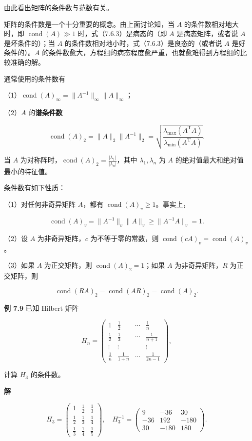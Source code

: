 \documentclass[
  10pt,
  fontset=fandol]{ctexart}
\begin{document}
由此看出矩阵的条件数与范数有关。

矩阵的条件数是一个十分重要的概念。由上面讨论知，当 \(A\) 的条件数相对地大时，即 \(\operatorname{cond}(A)\gg1\) 时，式（7.6.3）是病态的（即 \(A\) 是病态矩阵，或者说 \(A\) 是坏条件的）；当 \(A\) 的条件数相对地小时，式（7.6.3）是良态的（或者说 \(A\) 是好条件的）。\(A\) 的条件数愈大，方程组的病态程度愈严重，也就愈难得到方程组的比较准确的解。

通常使用的条件数有

（1）\(\operatorname{cond}(A)_\infty=\|A^{-1}\|_\infty\|A\|_\infty\)；

（2）\(A\) 的\textbf{谱条件数}

\[
\operatorname{cond}(A)_2=\|A\|_2\|A^{-1}\|_2
=\sqrt{\frac{\lambda_{\max}(A^{\mathrm T}A)}{\lambda_{\min}(A^{\mathrm T}A)}}.
\]

当 \(A\) 为对称阵时，\(\operatorname{cond}(A)_2=\frac{|\lambda_1|}{|\lambda_n|}\)，其中 \(\lambda_1,\lambda_n\) 为 \(A\) 的绝对值最大和绝对值最小的特征值。

条件数有如下性质：

（1）对任何非奇异矩阵 \(A\)，都有 \(\operatorname{cond}(A)_v\geqslant1\)。事实上，

\[
\operatorname{cond}(A)_v=\|A^{-1}\|_v\|A\|_v\geqslant\|A^{-1}A\|_v=1.
\]

（2）设 \(A\) 为非奇异矩阵，\(c\) 为不等于零的常数，则 \(\operatorname{cond}(cA)_v=\operatorname{cond}(A)_v\)。

（3）如果 \(A\) 为正交矩阵，则 \(\operatorname{cond}(A)_2=1\)；如果 \(A\) 为非奇异矩阵，\(R\) 为正交矩阵，则

\[
\operatorname{cond}(RA)_2=\operatorname{cond}(AR)_2=\operatorname{cond}(A)_2.
\]

\textbf{例 7.9} 已知 Hilbert 矩阵

\[
H_n=\begin{pmatrix}
1&\frac12&\cdots&\frac1n\\[4pt]
\frac12&\frac13&\cdots&\frac1{n+1}\\
\vdots&\vdots&&\vdots\\
\frac1n&\frac1{1+n}&\cdots&\frac1{2n-1}
\end{pmatrix},
\]

计算 \(H_3\) 的条件数。

\textbf{解}

\[
H_3=\begin{pmatrix}
1&\frac12&\frac13\\[4pt]
\frac12&\frac13&\frac14\\[4pt]
\frac13&\frac14&\frac15
\end{pmatrix},\quad
H_3^{-1}=\begin{pmatrix}
9&-36&30\\
-36&192&-180\\
30&-180&180
\end{pmatrix}.
\]
\end{document}
